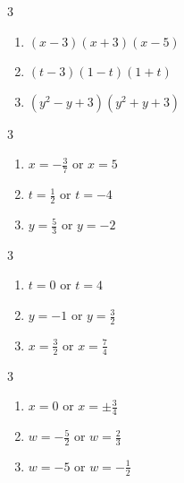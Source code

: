 \documentclass{ximera}
\begin{document}
\begin{multicols}{3}
\begin{enumerate}
\setcounter{enumi}{\value{HW}}

\item $(x-3)(x+3)(x-5)$
\item $(t-3)(1-t)(1+t)$
\item $(y^2-y+3)(y^2+y+3)$


\setcounter{HW}{\value{enumi}}
\end{enumerate}
\end{multicols}



\begin{multicols}{3}
\begin{enumerate}
\setcounter{enumi}{\value{HW}}

\item   $x = -\frac{3}{7}$ or $x = 5$ 
\item   $t = \frac{1}{2}$ or $t = -4$
\item   $y = \frac{5}{3}$ or $y = -2$

\setcounter{HW}{\value{enumi}}
\end{enumerate}
\end{multicols}


\begin{multicols}{3}
\begin{enumerate}
\setcounter{enumi}{\value{HW}}

\item   $t = 0$ or $t = 4$
\item   $y = -1$ or $y = \frac{3}{2}$ 
\item   $x = \frac{3}{2}$ or $x = \frac{7}{4}$ 

\setcounter{HW}{\value{enumi}}
\end{enumerate}
\end{multicols}


\begin{multicols}{3}
\begin{enumerate}
\setcounter{enumi}{\value{HW}}

\item $x = 0$ or $x = \pm \frac{3}{4}$ 
\item $w = -\frac{5}{2}$ or $w = \frac{2}{3}$
\item $w=-5$ or $w = -\frac{1}{2}$

\setcounter{HW}{\value{enumi}}
\end{enumerate}
\end{multicols}
\end{document}
